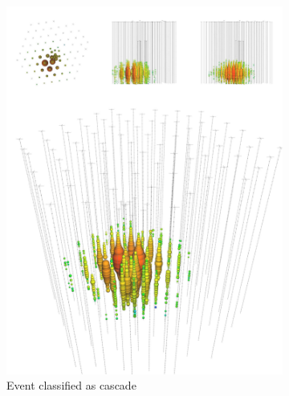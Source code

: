 \begin{figure}\label{fig:events}
    \begin{center}
        \begin{subfigure}{0.4\textwidth}
            \centering
            \includegraphics[clip, trim=0cm 0cm 0cm 30cm, width=1\textwidth]{figures/cascade_event.pdf}
            \caption{Event classified as cascade}  
            \label{fig:events_cascade}
          \end{subfigure}
        \begin{subfigure}{0.4\textwidth}
            \centering

\end{subfigure}
\end{center}
\end{figure}
